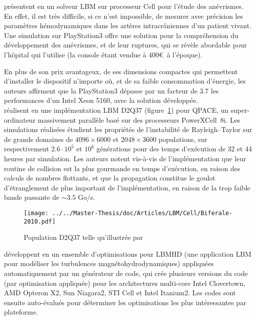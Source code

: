 \citet{sturmer_fluid_2009} présentent en \citeyear{sturmer_fluid_2009} un solveur \acs{LBM} sur processeur Cell pour l'étude des anévrismes. En effet, il est très difficile, si ce n'est impossible, de mesurer avec précision les paramètres hémodynamiques dans les artères intracrâniennes d'un patient vivant. Une simulation sur PlayStation3 offre une solution pour la compréhension du développement des anévrismes, et de leur ruptures, qui se révèle abordable pour l'hôpital qui l'utilise (la console étant vendue à 400\euro~à l'époque).

En plus de son prix avantageux, de ses dimensions compactes qui permettent d'installer le dispositif n'importe où, et de sa faible consommation d'énergie, les auteurs affirment que la PlayStation3 dépasse par un facteur de 3.7 les performances d'un Intel Xeon 5160, avec la solution développée.\\

\citet{biferale_lattice_2010} réalisent en \citeyear{biferale_lattice_2010} une implémentation \acs{LBM} D2Q37 (figure~\ref{fig:d2q37})  pour QPACE, un super-ordinateur massivement parallèle basé sur des processeurs PowerXCell~8i.
Les simulations réalisées étudient les propriétés de l'instabilité de Rayleigh–Taylor sur de grands domaines de $4096\times 6000$ et $2048\times 3600$ populations, sur respectivement $2.6\cdot 10^5$ et $10^6$ générations pour des temps d'exécution de 32 et 44 heures par simulation. 
Les auteurs notent vis-à-vis de l'implémentation que leur routine de collision est la plus gourmande en temps d'exécution, en raison des calculs de nombres flottants, et que la propagation constitue le goulot d'étranglement de plus important de l'implémentation, en raison de la trop faible bande passante de $\sim 3.5$ Go/s.

\begin{figure}[h]
	\centering
	\texttt{[image: ../../Master-Thesis/doc/Articles/LBM/Cell/Biferale-2010.pdf]}
	\caption{Population D2Q37 telle qu'illustrée par \citet{biferale_lattice_2010}}
	\label{fig:d2q37}
\end{figure}

\citet{williams_lattice_2008} développent en \citeyear{williams_lattice_2008}  un ensemble d'optimisations pour LBMHD (une application \acs{LBM} pour modéliser les turbulences magnétohydrodynamiques) appliquées automatiquement par un générateur de code, qui crée plusieurs versions du code (par optimisation appliquée) pour les architectures multi-core Intel Clovertown, AMD Opteron X2, Sun Niagara2, STI Cell et Intel Itanium2. Les codes sont ensuite auto-évalués pour déterminer les optimisations les plus intéressantes par plateforme.

